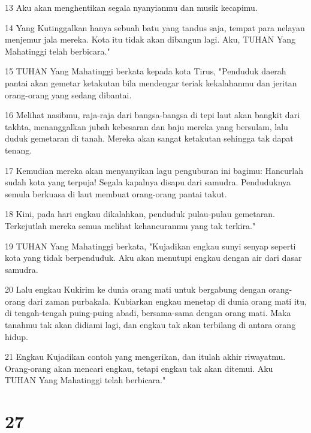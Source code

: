\par 13 Aku akan menghentikan segala nyanyianmu dan musik kecapimu.
\par 14 Yang Kutinggalkan hanya sebuah batu yang tandus saja, tempat para nelayan menjemur jala mereka. Kota itu tidak akan dibangun lagi. Aku, TUHAN Yang Mahatinggi telah berbicara."
\par 15 TUHAN Yang Mahatinggi berkata kepada kota Tirus, "Penduduk daerah pantai akan gemetar ketakutan bila mendengar teriak kekalahanmu dan jeritan orang-orang yang sedang dibantai.
\par 16 Melihat nasibmu, raja-raja dari bangsa-bangsa di tepi laut akan bangkit dari takhta, menanggalkan jubah kebesaran dan baju mereka yang bersulam, lalu duduk gemetaran di tanah. Mereka akan sangat ketakutan sehingga tak dapat tenang.
\par 17 Kemudian mereka akan menyanyikan lagu penguburan ini bagimu: Hancurlah sudah kota yang terpuja! Segala kapalnya disapu dari samudra. Penduduknya semula berkuasa di laut membuat orang-orang pantai takut.
\par 18 Kini, pada hari engkau dikalahkan, penduduk pulau-pulau gemetaran. Terkejutlah mereka semua melihat kehancuranmu yang tak terkira."
\par 19 TUHAN Yang Mahatinggi berkata, "Kujadikan engkau sunyi senyap seperti kota yang tidak berpenduduk. Aku akan menutupi engkau dengan air dari dasar samudra.
\par 20 Lalu engkau Kukirim ke dunia orang mati untuk bergabung dengan orang-orang dari zaman purbakala. Kubiarkan engkau menetap di dunia orang mati itu, di tengah-tengah puing-puing abadi, bersama-sama dengan orang mati. Maka tanahmu tak akan didiami lagi, dan engkau tak akan terbilang di antara orang hidup.
\par 21 Engkau Kujadikan contoh yang mengerikan, dan itulah akhir riwayatmu. Orang-orang akan mencari engkau, tetapi engkau tak akan ditemui. Aku TUHAN Yang Mahatinggi telah berbicara."

\chapter{27}

